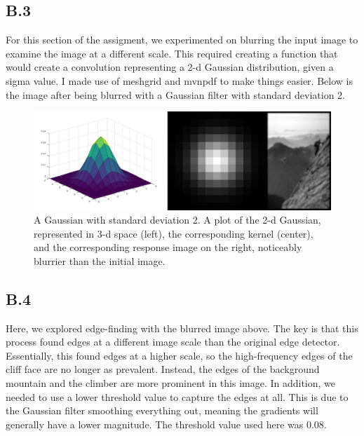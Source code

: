 \documentclass{article}
\begin{document}
\subsection{B.3}

For this section of the assigment, we experimented on blurring the input image 
to examine the image at a different scale. This required creating a function 
that would create a convolution representing a 2-d Gaussian distribution, given 
a sigma value. I made use of meshgrid and mvnpdf to make things easier. Below is 
the image after being blurred with a Gaussian filter with standard deviation 2.

\begin{figure}[!ht]
	\centering
	\includegraphics[width=160mm]{figs/gaussian_and_smoothed.png}
	\caption{A Gaussian with standard deviation 2. A plot of the 2-d Gaussian, represented in 3-d space (left), the corresponding kernel (center), and the 
        corresponding response image on the right, noticeably blurrier than the 
        initial image.}
\end{figure}

\subsection{B.4}

Here, we explored edge-finding with the blurred image above. The key is that this 
process found edges at a different image scale than the original edge detector. 
Essentially, this found edges at a higher scale, so the high-frequency edges of 
the cliff face are no longer as prevalent. Instead, the edges of the background 
mountain and the climber are more prominent in this image. In addition, we needed 
to use a lower threshold value to capture the edges at all. This is due to the 
Gaussian filter smoothing everything out, meaning the gradients will generally 
have a lower magnitude. The threshold value used here was 0.08.
\end{document}
